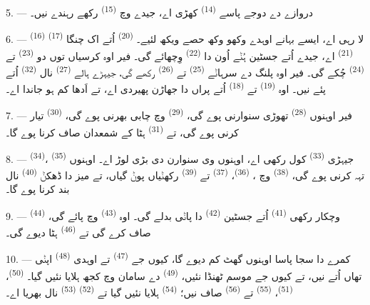 5. --- دروازے دے دوجے پاسے  \textsuperscript{(14)} کھڑی
اے، جیدے وچ  \textsuperscript{(15)} رکھے رہندے نیں۔

6. ---  \textsuperscript{(16)}  \textsuperscript{(17)}
لا رہی اے، ایسے بہانے اوہدے وکھو وکھ حصے ویکھ لئیے۔ 
\textsuperscript{(20)} اُتے اک چنگا  \textsuperscript{(21)}
اے، جیدے اُتے جسٹین ہُݨے اُون دا  \textsuperscript{(22)} وِچھائے گی۔ فیر
اوہ کرسیاں توں دو  \textsuperscript{(23)} تے 
\textsuperscript{(24)} چُکے گی۔ فیر اوہ پلنگ دے سرہاݨے 
\textsuperscript{(25)} تے  \textsuperscript{(26)} رکھے گی، جیہڑے ہالے
 \textsuperscript{(27)} نال 
\textsuperscript{(32)} اُتے پئے نیں۔ اوہ  \textsuperscript{(19)} تے
 \textsuperscript{(18)} اُتے پراں دا جھاڑن پھیردی اے، تے اَدھا کم ہو
جاندا اے۔

7. --- فیر اوہنوں  \textsuperscript{(28)} تھوڑی سنوارنی
پوے گی،  \textsuperscript{(29)} وچ چابی بھرنی پوے گی،
 \textsuperscript{(30)} تیار کرنی پوے گی، تے 
\textsuperscript{(31)} ہٹا کے شمعدان صاف کرنا پوے گا۔

\VUsaut{5.0mm}
\VUsaut{3.0mm}

8. ---  \textsuperscript{(34)}، جیہڑی 
\textsuperscript{(33)} کول رکھی اے، اوہنوں وی سنوارن دی بڑی لوڑ اے۔ اوہنوں
 \textsuperscript{(35)} تہہ کرنی پوے گی، 
\textsuperscript{(38)} وچ ،  \textsuperscript{(36)}،
 \textsuperscript{(37)} تے  \textsuperscript{(39)}
رکھݨیاں پوݨ گیاں، تے میز دا ڈھکݨ  \textsuperscript{(40)} نال بند کرنا
پوے گا۔

9. --- وچکار رکھی  \textsuperscript{(41)} اُتے جسٹین
 \textsuperscript{(42)} دا پاݨی بدلے گی۔ اوہ 
\textsuperscript{(43)} وچ  پائے گی، 
\textsuperscript{(44)} صاف کرے گی تے  \textsuperscript{(46)}
ہٹا دیوے گی۔

10. --- کمرے دا سجا پاسا اوہنوں گھٹ کم دیوے گا، کیوں جے 
\textsuperscript{(47)} تے اوہدی  \textsuperscript{(48)} اپݨی تھاں اُتے
نیں، تے کیوں جے موسم ٹھنڈا نئیں،  \textsuperscript{(49)} دے سامان
وچ کجھ ہلایا نئیں گیا۔  \textsuperscript{(50)}، 
\textsuperscript{(51)}،  \textsuperscript{(55)} تے
 \textsuperscript{(56)} صاف نیں؛ 
\textsuperscript{(54)} ہلایا نئیں گیا تے  \textsuperscript{(52)}
 \textsuperscript{(53)} نال بھریا اے۔

